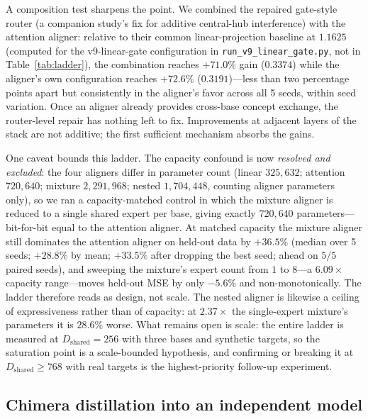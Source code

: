 \documentclass[10pt,twoside]{article}
\theoremstyle{definition}
\begin{document}
A composition test sharpens the point. We combined the repaired gate-style router (a companion study's fix for additive central-hub interference) with the attention aligner: relative to their common linear-projection baseline at $1.1625$ (computed for the v9-linear-gate configuration in \texttt{run\_v9\_linear\_gate.py}, not in Table~\ref{tab:ladder}), the combination reaches $+71.0\%$ gain ($0.3374$) while the aligner's own configuration reaches $+72.6\%$ ($0.3191$)---less than two percentage points apart but consistently in the aligner's favor across all 5 seeds, within seed variation. Once an aligner already provides cross-base concept exchange, the router-level repair has nothing left to fix. Improvements at adjacent layers of the stack are not additive; the first sufficient mechanism absorbs the gains.

One caveat bounds this ladder. The capacity confound is now \emph{resolved and excluded}: the four aligners differ in parameter count (linear $325{,}632$; attention $720{,}640$; mixture $2{,}291{,}968$; nested $1{,}704{,}448$, counting aligner parameters only), so we ran a capacity-matched control in which the mixture aligner is reduced to a single shared expert per base, giving exactly $720{,}640$ parameters---bit-for-bit equal to the attention aligner. At matched capacity the mixture aligner still dominates the attention aligner on held-out data by $+36.5\%$ (median over 5 seeds; $+28.8\%$ by mean; $+33.5\%$ after dropping the best seed; ahead on $5/5$ paired seeds), and sweeping the mixture's expert count from $1$ to $8$---a $6.09\times$ capacity range---moves held-out MSE by only $-5.6\%$ and non-monotonically. The ladder therefore reads as design, not scale. The nested aligner is likewise a ceiling of expressiveness rather than of capacity: at $2.37\times$ the single-expert mixture's parameters it is $28.6\%$ worse. What remains open is scale: the entire ladder is measured at $D_{\text{shared}}{=}256$ with three bases and synthetic targets, so the saturation point is a scale-bounded hypothesis, and confirming or breaking it at $D_{\text{shared}}{\geq}768$ with real targets is the highest-priority follow-up experiment.

\subsection{Chimera distillation into an independent model}
\label{sec:distill-exp}
\end{document}
